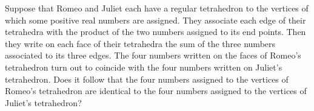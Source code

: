 Suppose that Romeo and Juliet each have a regular tetrahedron to the vertices of which some positive real numbers are assigned. They associate each edge of their tetrahedra with the product of the two numbers assigned to its end points. Then they write on each face of their tetrahedra the sum of the three numbers associated to its three edges. The four numbers written on the faces of Romeo's tetrahedron turn out to coincide with the four numbers written on Juliet's tetrahedron. Does it follow that the four numbers assigned to the vertices of Romeo's tetrahedron are identical to the four numbers assigned to the vertices of Juliet's tetrahedron?